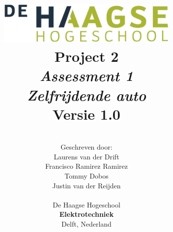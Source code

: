 \title{
\includegraphics[width=3.5in]{Media/Figuren/HHS.png} \\
\vspace*{2in}
\textbf{Project 2}\\
\textit{Assessment 1}\\
\textit{Zelfrijdende auto}\\
Versie 1.0
}
\author{
\vspace*{1.5in} \\
  Geschreven door:\\
  Laurens van der Drift\\
  Francisco Ramirez Ramirez\\
  Tommy Dobos\\
  Justin van der Reijden\\
		\vspace*{0.5in} \\
		De Haagse Hogeschool\\
        \textbf{Elektrotechniek}\\
        Delft, Nederland
       } 